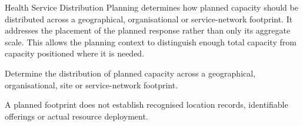 Health Service Distribution Planning determines how planned capacity should be distributed across a geographical, organisational or service-network footprint. It addresses the placement of the planned response rather than only its aggregate scale. This allows the planning context to distinguish enough total capacity from capacity positioned where it is needed.



Determine the distribution of planned capacity across a geographical, organisational, site or service-network footprint.



A planned footprint does not establish recognised location records, identifiable offerings or actual resource deployment.


